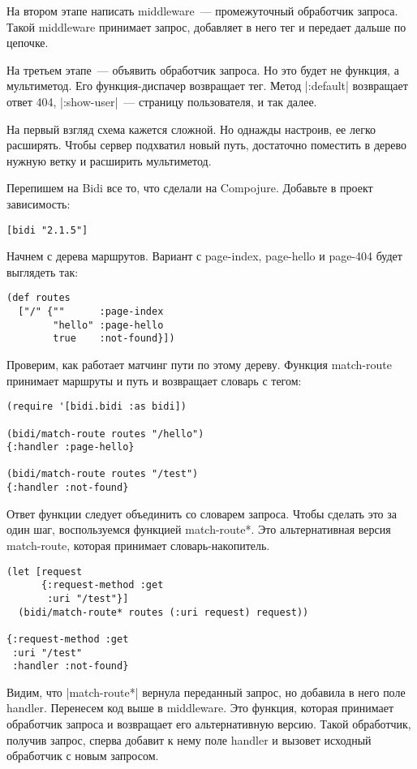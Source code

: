 На втором этапе написать middleware~--- промежуточный обработчик запроса. Такой
middleware принимает запрос, добавляет в него тег и передает дальше по цепочке.

На третьем этапе~--- объявить обработчик запроса. Но это будет не функция, а
мультиметод. Его функция-диспачер возвращает тег. Метод \spverb|:default| возвращает
ответ 404, \spverb|:show-user|~--- страницу пользователя, и так далее.

На первый взгляд схема кажется сложной. Но однажды настроив, ее легко
расширять. Чтобы сервер подхватил новый путь, достаточно поместить в дерево
нужную ветку и расширить мультиметод.

Перепишем на Bidi все то, что сделали на Compojure. Добавьте в проект
зависимость:

\begin{verbatim}
[bidi "2.1.5"]
\end{verbatim}

Начнем с дерева маршрутов. Вариант с page-index, page-hello и page-404 будет выглядеть так:

\begin{verbatim}
(def routes
  ["/" {""      :page-index
        "hello" :page-hello
        true    :not-found}])
\end{verbatim}

Проверим, как работает матчинг пути по этому дереву. Функция match-route
принимает маршруты и путь и возвращает словарь с тегом:

\begin{verbatim}
(require '[bidi.bidi :as bidi])

(bidi/match-route routes "/hello")
{:handler :page-hello}

(bidi/match-route routes "/test")
{:handler :not-found}
\end{verbatim}

Ответ функции следует объединить со словарем запроса. Чтобы сделать это за один
шаг, воспользуемся функцией match-route*. Это альтернативная версия match-route,
которая принимает словарь-накопитель.

\begin{verbatim}
(let [request
      {:request-method :get
       :uri "/test"}]
  (bidi/match-route* routes (:uri request) request))

{:request-method :get
 :uri "/test"
 :handler :not-found}
\end{verbatim}

Видим, что \spverb|match-route*| вернула переданный запрос, но добавила в него поле
handler. Перенесем код выше в middleware. Это функция, которая принимает
обработчик запроса и возвращает его альтернативную версию. Такой обработчик,
получив запрос, сперва добавит к нему поле handler и вызовет исходный обработчик
с новым запросом.

